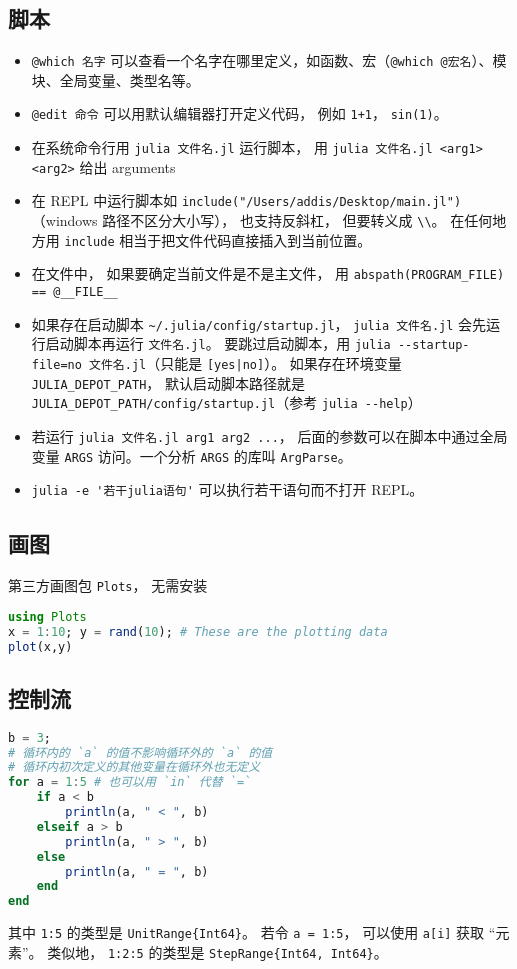 \subsection{脚本}
\begin{itemize}
\item \verb`@which 名字` 可以查看一个名字在哪里定义，如函数、宏（\verb`@which @宏名`）、模块、全局变量、类型名等。
\item \verb`@edit 命令` 可以用默认编辑器打开定义代码， 例如 \verb`1+1`， \verb`sin(1)`。
\item 在系统命令行用 \verb`julia 文件名.jl` 运行脚本， 用 \verb`julia 文件名.jl <arg1> <arg2>` 给出 arguments
\item 在 REPL 中运行脚本如 \verb`include("/Users/addis/Desktop/main.jl")`（windows 路径不区分大小写）， 也支持反斜杠， 但要转义成 \verb`\\`。 在任何地方用 \verb`include` 相当于把文件代码直接插入到当前位置。
\item 在文件中， 如果要确定当前文件是不是主文件， 用 \verb`abspath(PROGRAM_FILE) == @__FILE__`
\item 如果存在启动脚本 \verb`~/.julia/config/startup.jl`， \verb`julia 文件名.jl` 会先运行启动脚本再运行 \verb`文件名.jl`。 要跳过启动脚本，用 \verb`julia --startup-file=no 文件名.jl`（只能是 \verb`[yes|no]`）。 如果存在环境变量 \verb`JULIA_DEPOT_PATH`， 默认启动脚本路径就是 \verb`JULIA_DEPOT_PATH/config/startup.jl`（参考 \verb`julia --help`）
\item 若运行 \verb`julia 文件名.jl arg1 arg2 ...`， 后面的参数可以在脚本中通过全局变量 \verb`ARGS` 访问。一个分析 \verb`ARGS` 的库叫 \verb`ArgParse`。
\item \verb`julia -e '若干julia语句'` 可以执行若干语句而不打开 REPL。
\end{itemize}

\subsection{画图}
第三方画图包 \verb`Plots`， 无需安装
\begin{lstlisting}[language=Julia]
using Plots
x = 1:10; y = rand(10); # These are the plotting data
plot(x,y)
\end{lstlisting}

\subsection{控制流}
\begin{lstlisting}[language=Julia]
b = 3;
# 循环内的 `a` 的值不影响循环外的 `a` 的值
# 循环内初次定义的其他变量在循环外也无定义
for a = 1:5 # 也可以用 `in` 代替 `=`
    if a < b
        println(a, " < ", b)
    elseif a > b
        println(a, " > ", b)
    else
        println(a, " = ", b)
    end
end
\end{lstlisting}
其中 \verb`1:5` 的类型是 \verb`UnitRange{Int64}`。 若令 \verb`a = 1:5`， 可以使用 \verb`a[i]` 获取 “元素”。 类似地， \verb`1:2:5` 的类型是 \verb`StepRange{Int64, Int64}`。

